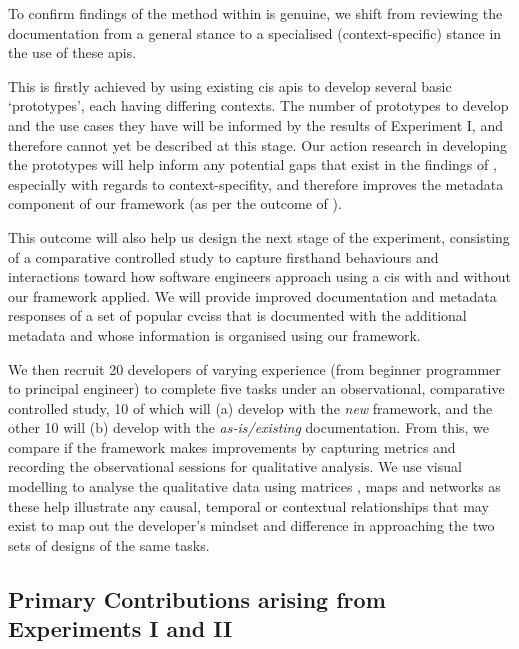 To confirm findings of the method within  is genuine, we shift from reviewing the documentation from a general stance to a specialised (context-specific) stance in the use of these \glspl{api}.

This is firstly achieved by using existing \gls{cis} \glspl{api} to develop several basic `prototypes', each having differing contexts. The number of prototypes to develop and the use cases they have will be informed by the results of Experiment I, and therefore cannot yet be described at this stage. Our action research in developing the prototypes will help inform any potential gaps that exist in the findings of , especially with regards to context-specifity, and therefore improves the metadata component of our framework (as per the outcome of ). 

This outcome will also help us design the next stage of the experiment, consisting of a comparative controlled study \citep{Seaman:2007wa} to capture firsthand behaviours and interactions toward how software engineers approach using a \gls{cis} with and without our framework applied. We will provide improved documentation and metadata responses of a set of popular \glspl{cvcis} that is documented with the additional metadata and whose information is organised using our framework. 

We then recruit 20 developers of varying experience (from beginner programmer to principal engineer) to complete five tasks under an observational, comparative controlled study, 10 of which will (a) develop with the \textit{new} framework, and the other 10 will (b) develop with the \textit{as-is/existing} documentation. From this, we compare if the framework makes improvements by capturing metrics and recording the observational sessions for qualitative analysis. We use visual modelling to analyse the qualitative data using matrices \citep{Dey:2003ty}, maps and networks \citep{Miles:1994ty} as these help illustrate any causal, temporal or contextual relationships that may exist to map out the developer's mindset and difference in approaching the two sets of designs of the same tasks.


\subsection{Primary Contributions arising from Experiments I and II}
\label{ssec:research-methodology:experiments:contribution}

